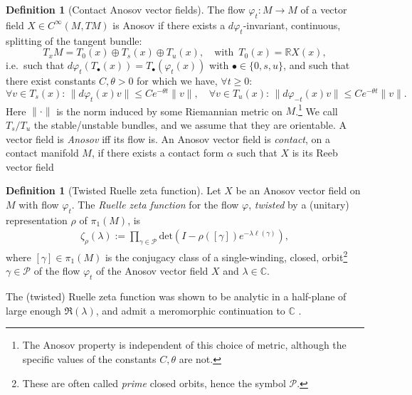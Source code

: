 \documentclass[reqno]{amsart}
\theoremstyle{definition}
\newtheorem{defn}[thm]{Definition}
\theoremstyle{remark}
\renewcommand{\phi}{\varphi}
\newcommand{\R}{\mathbb{R}}
\newcommand{\C}{C^\infty}
\begin{document}
\begin{defn}[Contact Anosov vector fields]
\label{def_anosov}
The flow $\phi_t\colon M\to M$ of a vector field $X\in\C(M,TM)$ is Anosov if there exists a $d\phi_t$-invariant, continuous, splitting of the tangent bundle:
\begin{equation*}
    T_xM = T_0(x) \oplus T_s(x) \oplus T_u(x), \quad\text{with }\, T_0(x) = \R X(x),
\end{equation*}
i.e.\ such that $d\phi_t(T_\bullet(x)) = T_\bullet(\phi_t(x))$ with $\bullet \in \{0, s, u\}$, and such that there exist constants $C, \theta >0$ for which we have, $\forall t \ge 0$:
\begin{equation*}
    \forall v \in T_s(x):\, \|d\phi_t(x)v\| \le Ce^{-\theta t}\|v\|, \quad \forall v \in T_u(x):\, \|d\phi_{-t}(x)v\| \le Ce^{-\theta t}\|v\|.
\end{equation*}
Here $\|\cdot\|$ is the norm induced by some Riemannian metric on $M$.\footnote{The Anosov property is independent of this choice of metric, although the specific values of the constants $C, \theta$ are not.} 
We call $T_s/T_u$ the stable/unstable bundles, and we assume that they are orientable. A vector field is \emph{Anosov} iff its flow is. An Anosov vector field is \emph{contact}, on a contact manifold $M$, if there exists a contact form $\alpha$ such that $X$ is its Reeb vector field
\end{defn}

\begin{defn}[Twisted Ruelle zeta function]
Let $X$ be an Anosov vector field on $M$ with flow $\varphi_t$. The \emph{Ruelle zeta function} for the flow $\varphi$, \emph{twisted} by a (unitary) representation $\rho$ of $\pi_1(M)$, is
\begin{align}\label{ruellezetafunction}
    \zeta_\rho (\lambda) := \prod_{\gamma \in \mathcal{P}} \mathrm{det}(I - \rho([\gamma])e^{-\lambda \ell(\gamma)}),
\end{align}
where $[\gamma]\in\pi_1(M)$ is the conjugacy class of a single-winding, closed, orbit\footnote{These are often called \emph{prime} closed orbits, hence the symbol $\mathcal{P}$.} $\gamma \in \mathcal{P}$ of the flow $\phi_t$ of the Anosov vector field $X$ and $\lambda \in \mathbb{C}$.
\end{defn}

\begin{rmk}
    The (twisted) Ruelle zeta function was shown to be analytic in a half-plane of large enough $\Re(\lambda)$, and admit a meromorphic continuation to $\mathbb{C}$ \cite{butterley2007smooth, marklof2004selberg, giulietti2013anosov, DyatlovZworski_RuelleZeta,DyatlovGuillarmou}.
\end{rmk}
\end{document}
